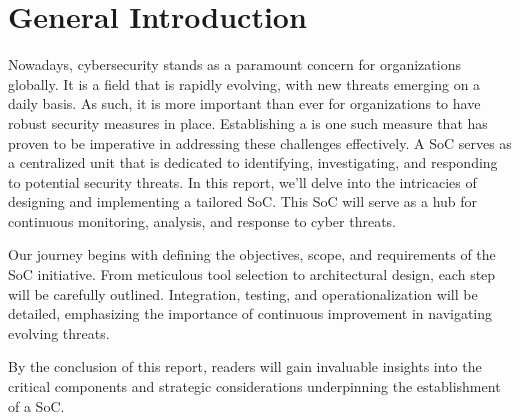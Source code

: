 \thispagestyle{plain} %
\section*{General Introduction}
Nowadays, cybersecurity stands as a paramount concern for organizations globally. It is a field that is rapidly evolving, with new threats emerging on a daily basis. As such, it is more important than ever for organizations to have robust security measures in place. Establishing a  is one such measure that has proven to be imperative in addressing these challenges effectively. A SoC serves as a centralized unit that is dedicated to identifying, investigating, and responding to potential security threats. In this report, we'll delve into the intricacies of designing and implementing a tailored SoC. This SoC will serve as a hub for continuous monitoring, analysis, and response to cyber threats.

Our journey begins with defining the objectives, scope, and requirements of the SoC initiative. From meticulous tool selection to architectural design, each step will be carefully outlined. Integration, testing, and operationalization will be detailed, emphasizing the importance of continuous improvement in navigating evolving threats.

By the conclusion of this report, readers will gain invaluable insights into the critical components and strategic considerations underpinning the establishment of a SoC.

\newpage
